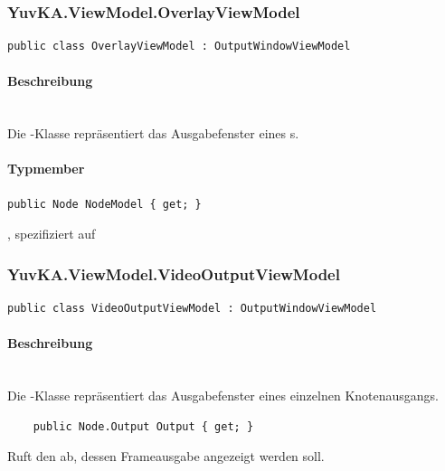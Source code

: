 \subsubsection{YuvKA.ViewModel.OverlayViewModel}

\begin{verbatim}
public class OverlayViewModel : OutputWindowViewModel
\end{verbatim}

\paragraph{Beschreibung}~\\
Die -Klasse repräsentiert das Ausgabefenster eines s.

\paragraph{Typmember}
\begin{itemize}

	\begin{verbatim}
public Node NodeModel { get; }
	\end{verbatim}
	, spezifiziert auf 

\end{itemize}

\subsubsection{YuvKA.ViewModel.VideoOutputViewModel}

\begin{verbatim}
public class VideoOutputViewModel : OutputWindowViewModel
\end{verbatim}

\paragraph{Beschreibung}~\\
Die -Klasse repräsentiert das Ausgabefenster eines einzelnen Knotenausgangs.

\begin{itemize}

	\begin{verbatim}
	public Node.Output Output { get; }
	\end{verbatim}
	Ruft den  ab, dessen Frameausgabe angezeigt werden soll.

\end{itemize}
